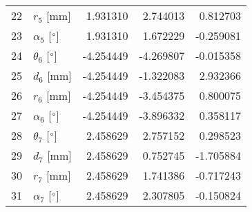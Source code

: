 \documentclass{standalone}%
\begin{document}
\begin{tabular}{llrrr}
22 &              $r_{5}$ [mm] &  1.931310 &   2.744013 &   0.812703 \\
23 &  $\alpha_{5}$ [$\degree$] &  1.931310 &   1.672229 &  -0.259081 \\
24 &  $\theta_{6}$ [$\degree$] & -4.254449 &  -4.269807 &  -0.015358 \\
25 &              $d_{6}$ [mm] & -4.254449 &  -1.322083 &   2.932366 \\
26 &              $r_{6}$ [mm] & -4.254449 &  -3.454375 &   0.800075 \\
27 &  $\alpha_{6}$ [$\degree$] & -4.254449 &  -3.896332 &   0.358117 \\
28 &  $\theta_{7}$ [$\degree$] &  2.458629 &   2.757152 &   0.298523 \\
29 &              $d_{7}$ [mm] &  2.458629 &   0.752745 &  -1.705884 \\
30 &              $r_{7}$ [mm] &  2.458629 &   1.741386 &  -0.717243 \\
31 &  $\alpha_{7}$ [$\degree$] &  2.458629 &   2.307805 &  -0.150824 \\
\bottomrule
\end{tabular}
%
\end{document}
